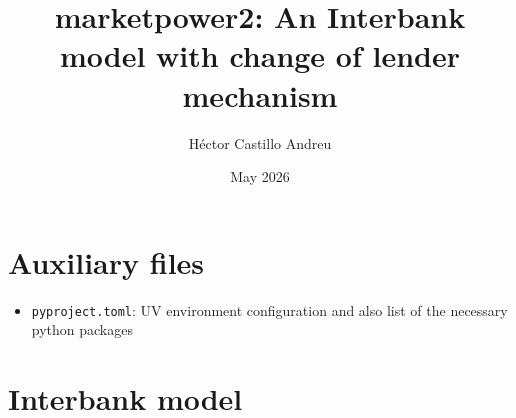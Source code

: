 \documentclass{article}
\title{marketpower2: An Interbank model with change of lender mechanism}
\author{Héctor Castillo Andreu}
\date{May 2026}
\begin{document}
\maketitle

\section{Auxiliary files}
\begin{itemize}
    \item \texttt{pyproject.toml}: UV environment configuration and also list of the necessary python packages
\end{itemize}

\section{Interbank model}
\end{document}
